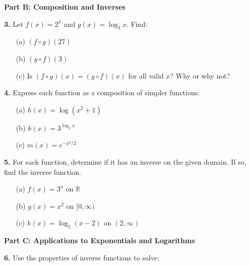 \documentclass[12pt]{article}
\begin{document}
\textbf{Part B: Composition and Inverses}

\textbf{3.} Let $f(x) = 2^x$ and $g(x) = \log_3 x$. Find:

\begin{enumerate}
\item[(a)] $(f \circ g)(27)$
\vspace{3cm}

\item[(b)] $(g \circ f)(3)$
\vspace{3cm}

\item[(c)] Is $(f \circ g)(x) = (g \circ f)(x)$ for all valid $x$? Why or why not?
\vspace{3cm}
\end{enumerate}

\textbf{4.} Express each function as a composition of simpler functions:

\begin{enumerate}
\item[(a)] $h(x) = \log(x^2 + 1)$
\vspace{3cm}

\item[(b)] $k(x) = 3^{\log_2 x}$
\vspace{3cm}

\item[(c)] $m(x) = e^{-x^2/2}$
\vspace{3cm}
\end{enumerate}

\textbf{5.} For each function, determine if it has an inverse on the given domain. If so, find the inverse function.

\begin{enumerate}
\item[(a)] $f(x) = 3^x$ on $\mathbb{R}$
\vspace{3cm}

\item[(b)] $g(x) = x^2$ on $[0, \infty)$
\vspace{3cm}

\item[(c)] $h(x) = \log_5(x - 2)$ on $(2, \infty)$
\vspace{3cm}
\end{enumerate}

\newpage

\textbf{Part C: Applications to Exponentials and Logarithms}

\textbf{6.} Use the properties of inverse functions to solve:
\end{document}
